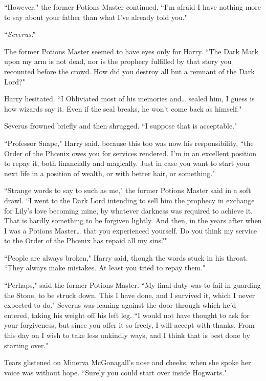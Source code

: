 ``However," the former Potions Master continued, ``I'm afraid I have nothing more to say about your father than what I've already told you."

``\emph{Severus!}"

The former Potions Master seemed to have eyes only for Harry. ``The Dark Mark upon my arm is not dead, nor is the prophecy fulfilled by that story you recounted before the crowd. How did you destroy all but a remnant of the Dark Lord?"

Harry hesitated. ``I Obliviated most of his memories and{\ldots} sealed him, I guess is how wizards say it. Even if the seal breaks, he won't come back as himself."

Severus frowned briefly and then shrugged. ``I suppose that is acceptable."

``Professor Snape," Harry said, because this too was now his responsibility, ``the Order of the Phœnix owes you for services rendered. I'm in an excellent position to repay it, both financially and magically. Just in case you want to start your next life in a position of wealth, or with better hair, or something."

``Strange words to say to such as me," the former Potions Master said in a soft drawl. ``I went to the Dark Lord intending to sell him the prophecy in exchange for Lily's love becoming mine, by whatever darkness was required to achieve it. That is hardly something to be forgiven lightly. And then, in the years after when I was a Potions Master{\ldots} that you experienced yourself. Do you think my service to the Order of the Phœnix has repaid all my sins?"

``People are always broken," Harry said, though the words stuck in his throat. ``They always make mistakes. At least you tried to repay them."

``Perhaps," said the former Potions Master. ``My final duty was to fail in guarding the Stone, to be struck down. This I have done, and I survived it, which I never expected to do." Severus was leaning against the door through which he'd entered, taking his weight off his left leg. ``I would not have thought to ask for your forgiveness, but since you offer it so freely, I will accept with thanks. From this day on I wish to take less unkindly ways, and I think that is best done by starting over."

Tears glistened on Minerva McGonagall's nose and cheeks, when she spoke her voice was without hope. ``Surely you could start over inside Hogwarts."

